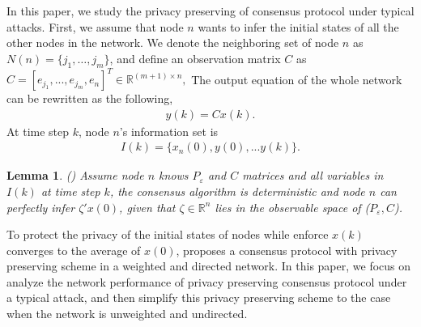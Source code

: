 \documentclass[10pt,journal,compsoc]{IEEEtran}
\newtheorem{lem}{Lemma}
\begin{document}
In this paper, we study the privacy preserving of consensus protocol under typical attacks. First, we assume that node $n$ wants to infer the initial states of all the other nodes in the network. We denote the neighboring set of node $n$ as $N(n)=\{j_{1},\ldots,j_{m}\}$, and define an observation matrix $C$ as
$
C=[e_{j_{1}},...,e_{j_{m}},e_{n}]^{T}\in \mathbb{R}^{(m+1)\times n},
$
The output equation of the whole network can be rewritten as the following,
\begin{equation}\label{Output equation}
\begin{split}
y(k)=Cx(k).
\end{split}
\end{equation}
At time step $k$, node $n$'s information set is
\begin{equation} \label{Information matix}
\begin{split}
I(k)=\{x_{n}(0), y(0), ...y(k)\}.
\end{split}
\end{equation}

\begin{lem}
(\cite{Mo2016Privacy})
Assume node $n$ knows $P_{\varepsilon}$ and $C$ matrices and all variables in $I(k)$ at time step $k$, the consensus algorithm is deterministic and node $n$ can perfectly infer $\zeta'x(0)$, given that $\zeta \in \mathbb{R}^{n}$ lies in the observable space of ($P_{\varepsilon}, C$).
\end{lem}
To protect the privacy of the initial states of nodes while enforce $x(k)$ converges to the average of $x(0)$, \cite{Manitara2013Privacy} proposes a consensus protocol with privacy preserving scheme in a weighted and directed network. In this paper, we focus on analyze the network performance of privacy preserving consensus protocol under a typical attack, and then simplify this privacy preserving scheme to the case when the network is unweighted and undirected.
\end{document}

